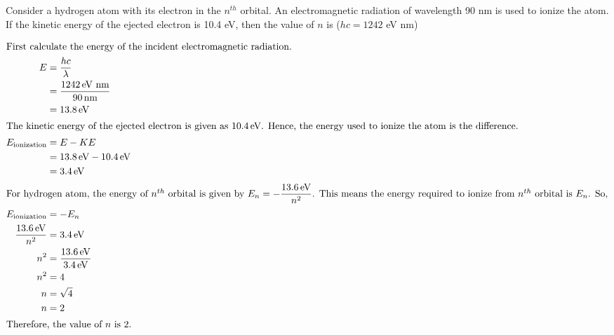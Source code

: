 

    \item Consider a hydrogen atom with its electron in the \(n^{th}\) orbital. An electromagnetic radiation of wavelength 90 nm is used to ionize the atom. If the kinetic energy of the ejected electron is 10.4 eV, then the value of \(n\) is (\(hc = 1242\) eV nm)
    \underline{\hspace{2.5 cm}}

    \begin{solution}
        \begin{align*}
            \intertext{First calculate the energy of the incident electromagnetic radiation.}
            E &= \dfrac{hc}{\lambda}\\
            &= \dfrac{1242 \,\text{eV nm}}{90 \,\text{nm}}\\
            &= 13.8 \,\text{eV}\\
            \intertext{The kinetic energy of the ejected electron is given as \(10.4 \,\text{eV}\). Hence, the energy used to ionize the atom is the difference.}
            E_{\text{ionization}} &= E - KE\\
            &= 13.8 \,\text{eV} - 10.4 \,\text{eV}\\
            &= 3.4 \,\text{eV}\\
            \intertext{For hydrogen atom, the energy of \(n^{th}\) orbital is given by \(E_n = - \dfrac{13.6\, \text{eV}}{n^2}\). This means the energy required to ionize from \(n^{th}\) orbital is \(E_n\). So,}
            E_{\text{ionization}} &= -E_n\\
            \dfrac{13.6\, \text{eV}}{n^2} &= 3.4\, \text{eV}\\
            n^2 &= \dfrac{13.6\, \text{eV}}{3.4\, \text{eV}}\\
            n^2 &= 4\\
            n &= \sqrt{4}\\
            n &= 2\\
            \intertext{Therefore, the value of \(n\) is \(2\).}
        \end{align*}
    \end{solution}

